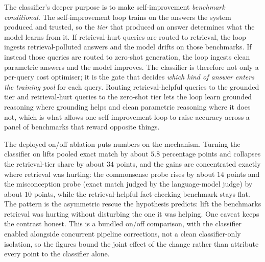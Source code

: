 \begin{precise}
The classifier's deeper purpose is to make self-improvement \emph{benchmark
conditional}. The self-improvement loop trains on the answers the system produced and
trusted, so the \emph{tier} that produced an answer determines what the model learns
from it. If retrieval-hurt queries are routed to retrieval, the loop ingests
retrieval-polluted answers and the model drifts on those benchmarks. If instead
those queries are routed to zero-shot generation, the loop ingests clean parametric
answers and the model improves. The classifier is therefore not only a
per-query cost optimiser; it is the gate that decides \emph{which kind of answer
enters the training pool} for each query. Routing retrieval-helpful queries to the
grounded tier and retrieval-hurt queries to the zero-shot tier lets the loop learn
grounded reasoning where grounding helps and clean parametric reasoning where it does
not, which is what allows one self-improvement loop to raise accuracy across a panel
of benchmarks that reward opposite things.
\end{precise}

\begin{bythenumbers}
The deployed on/off ablation puts numbers on the mechanism. Turning the classifier on
lifts pooled exact match by about $5.8$ percentage points and collapses the
retrieval-tier share by about $34$ points, and the gains are concentrated exactly where
retrieval was hurting: the commonsense probe rises by about $14$ points and the
misconception probe (exact match judged by the language-model judge) by about $10$
points, while the retrieval-helpful fact-checking benchmark stays flat. The pattern is
the asymmetric rescue the hypothesis predicts: lift the benchmarks retrieval was hurting
without disturbing the one it was helping. One caveat keeps the contrast honest. This is
a bundled on/off comparison, with the classifier enabled alongside concurrent pipeline
corrections, not a clean classifier-only isolation, so the figures bound the joint
effect of the change rather than attribute every point to the classifier alone.
\end{bythenumbers}

